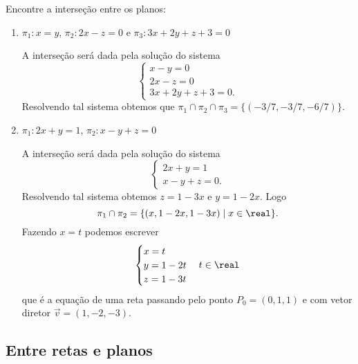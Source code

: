 \begin{exemplos}
    Encontre a interse\c{c}\~ao entre os planos:
    \begin{enumerate}
        \item $\pi_1 : x = y$, $\pi_2 : 2x - z = 0$ e $\pi_3 : 3x + 2y + z + 3 = 0$
        \begin{solucao}
            A interse\c{c}\~ao ser\'a dada pela solu\c{c}\~ao do sistema
            \[
                \begin{cases}
                    x - y = 0\\
                    2x - z = 0\\
                    3x + 2y + z + 3 = 0.
                \end{cases}
            \]
            Resolvendo tal sistema obtemos que $\pi_1\cap\pi_2\cap\pi_3 = \{(-3/7,-3/7,-6/7)\}$.
        \end{solucao}
        \item $\pi_1 : 2x + y = 1$, $\pi_2 : x - y + z = 0$
        \begin{solucao}
            A interse\c{c}\~ao ser\'a dada pela solu\c{c}\~ao do sistema
            \[
                \begin{cases}
                    2x + y = 1\\
                    x - y + z = 0.
                \end{cases}
            \]
            Resolvendo tal sistema obtemos $z = 1 - 3x$ e $y = 1 - 2x$. Logo
            \[
                \pi_1\cap\pi_2 = \{(x,1 - 2x,1 - 3x) \mid x \in \real\}.
            \]
            Fazendo $x = t$ podemos escrever
            \[
                \begin{cases}
                    x = t\\
                    y = 1 - 2t\\
                    z = 1 - 3t
                \end{cases} t \in \real
            \]
            que \'e a equa\c{c}\~ao de uma reta passando pelo ponto $P_0 = (0,1,1)$ e com vetor diretor $\vec{v} = (1,-2,-3)$.
        \end{solucao}
    \end{enumerate}
\end{exemplos}


\subsection{Entre retas e planos} %
\label{sub:entre_retas_e_planos}

